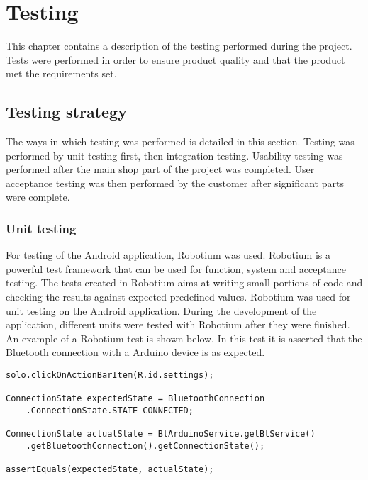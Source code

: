 \chapter{Testing}
	This chapter contains a description of the testing performed during the project. Tests were performed in order to ensure product quality and that the product met the requirements set.
	
	\section{Testing strategy}
		The ways in which testing was performed is detailed in this section. Testing was performed by unit testing first, then integration testing. Usability testing was performed after the main shop part of the project was completed. User acceptance testing was then performed by the customer after significant parts were complete.

		\subsection{Unit testing}
			For testing of the Android application, Robotium was used. Robotium is a powerful test framework that can be used for function, system and acceptance testing. The tests created in Robotium aims at writing small portions of code and checking the results against expected predefined values. Robotium was used for unit testing on the Android application. During the development of the application, different units were tested with Robotium after they were finished. An example of a Robotium test is shown below. In this test it is asserted that the Bluetooth connection with a Arduino device is as expected. \\

			\begin{lstlisting}
solo.clickOnActionBarItem(R.id.settings);

ConnectionState expectedState = BluetoothConnection
	.ConnectionState.STATE_CONNECTED;
	
ConnectionState actualState = BtArduinoService.getBtService()
	.getBluetoothConnection().getConnectionState();

assertEquals(expectedState, actualState);
			\end{lstlisting}

